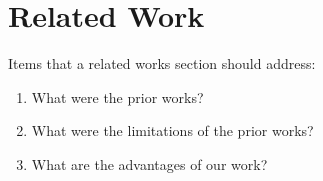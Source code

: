 \documentclass[conference]{IEEEtran}
\newcommand{\TODO}[1]{{\color{red} {{#1}}  }}
\begin{document}

\section{Related Work}\label{sec:related-work}

\TODO{
  Items that a related works section should address:
  \begin{enumerate}
  \item What were the prior works?
  \item What were the limitations of the prior works?
  \item What are the advantages of our work?
  \end{enumerate}
}
\end{document}
